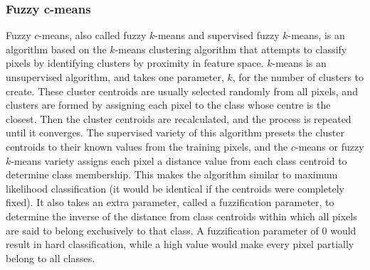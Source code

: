 \documentclass[a4paper,10pt]{article}
\begin{document}
\begin{table}
  \begin{center}
  \end{center}
  \caption{Feature comparison between classification algorithms whose classification accuracy will be compared in the thesis. ``Partially fuzzy'' means the capability of training only on endmember pixels.}
  \label{tbl-comparison}
\end{table}

\subsubsection{Fuzzy c-means}

Fuzzy $c$-means, also called fuzzy $k$-means and supervised fuzzy $k$-means, is an algorithm based on the $k$-means clustering algorithm that attempts to classify pixels by identifying clusters by proximity in feature space. $k$-means is an unsupervised algorithm, and takes one parameter, $k$, for the number of clusters to create. These cluster centroids are usually selected randomly from all pixels, and clusters are formed by assigning each pixel to the class whose centre is the closest. Then the cluster centroids are recalculated, and the process is repeated until it converges. The supervised variety of this algorithm presets the cluster centroids to their known values from the training pixels, and the $c$-means or fuzzy $k$-means variety assigns each pixel a distance value from each class centroid to determine class membership. This makes the algorithm similar to maximum likelihood classification (it would be identical if the centroids were completely fixed). It also takes an extra parameter, called a fuzzification parameter, to determine the inverse of the distance from class centroids within which all pixels are said to belong exclusively to that class. A fuzzification parameter of 0 would result in hard classification, while a high value would make every pixel partially belong to all classes. \citep{hengl2004fuzzycmeans}
\end{document}
